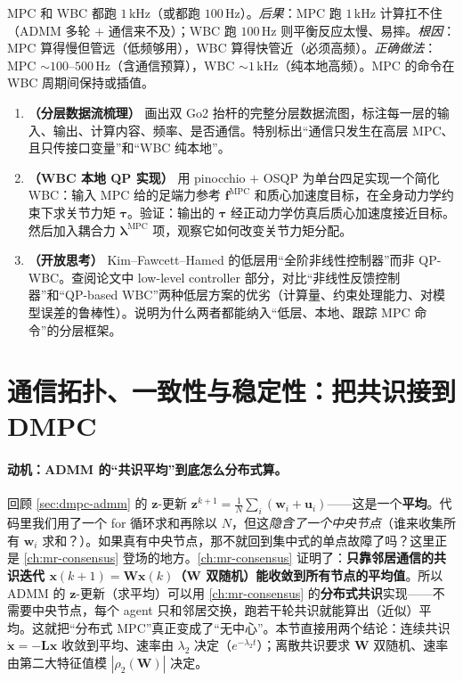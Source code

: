 \begin{pitfall}
MPC 和 WBC 都跑 $1$\,kHz（或都跑 $100$\,Hz）。\emph{后果}：MPC 跑 $1$\,kHz 计算扛不住（ADMM 多轮 $+$ 通信来不及）；WBC 跑 $100$\,Hz 则平衡反应太慢、易摔。\emph{根因}：MPC 算得慢但管远（低频够用），WBC 算得快管近（必须高频）。\emph{正确做法}：MPC $\sim100$–$500$\,Hz（含通信预算），WBC $\sim1$\,kHz（纯本地高频）。MPC 的命令在 WBC 周期间保持或插值。
\end{pitfall}

\begin{exercise}
\begin{enumerate}
  \item \textbf{（分层数据流梳理）} 画出双 Go2 抬杆的完整分层数据流图，标注每一层的输入、输出、计算内容、频率、是否通信。特别标出“通信只发生在高层 MPC、且只传接口变量”和“WBC 纯本地”。
  \item \textbf{（WBC 本地 QP 实现）} 用 pinocchio $+$ OSQP 为单台四足实现一个简化 WBC：输入 MPC 给的足端力参考 $\mathbf{f}^{\text{MPC}}$ 和质心加速度目标，在全身动力学约束下求关节力矩 $\boldsymbol{\tau}$。验证：输出的 $\boldsymbol{\tau}$ 经正动力学仿真后质心加速度接近目标。然后加入耦合力 $\boldsymbol{\lambda}^{\text{MPC}}$ 项，观察它如何改变关节力矩分配。
  \item \textbf{（开放思考）} Kim--Fawcett--Hamed\cite{kim2023layered} 的低层用“全阶非线性控制器”而非 QP-WBC。查阅论文中 low-level controller 部分，对比“非线性反馈控制器”和“QP-based WBC”两种低层方案的优劣（计算量、约束处理能力、对模型误差的鲁棒性）。说明为什么两者都能纳入“低层、本地、跟踪 MPC 命令”的分层框架。
\end{enumerate}
\end{exercise}

\section{通信拓扑、一致性与稳定性：把共识接到 DMPC}
\label{sec:dmpc-topo}

\paragraph{动机：ADMM 的“共识平均”到底怎么分布式算。}
回顾 \cref{sec:dmpc-admm} 的 $\mathbf{z}$-更新 $\mathbf{z}^{k+1}=\tfrac{1}{N}\sum_i(\mathbf{w}_i+\mathbf{u}_i)$——这是一个\textbf{平均}。代码里我们用了一个 for 循环求和再除以 $N$，但这\emph{隐含了一个中央节点}（谁来收集所有 $\mathbf{w}_i$ 求和？）。如果真有中央节点，那不就回到集中式的单点故障了吗？这里正是 \cref{ch:mr-consensus} 登场的地方。\cref{ch:mr-consensus} 证明了：\textbf{只靠邻居通信的共识迭代 $\mathbf{x}(k{+}1)=\mathbf{W}\mathbf{x}(k)$（$\mathbf{W}$ 双随机）能收敛到所有节点的平均值}。所以 ADMM 的 $\mathbf{z}$-更新（求平均）可以用 \cref{ch:mr-consensus} 的\textbf{分布式共识}实现——不需要中央节点，每个 agent 只和邻居交换，跑若干轮共识就能算出（近似）平均。这就把“分布式 MPC”真正变成了“无中心”。本节直接用两个结论：连续共识 $\dot{\mathbf{x}}=-\mathbf{L}\mathbf{x}$ 收敛到平均、速率由 $\lambda_2$ 决定（$e^{-\lambda_2 t}$）；离散共识要求 $\mathbf{W}$ 双随机、速率由第二大特征值模 $|\rho_2(\mathbf{W})|$ 决定。

